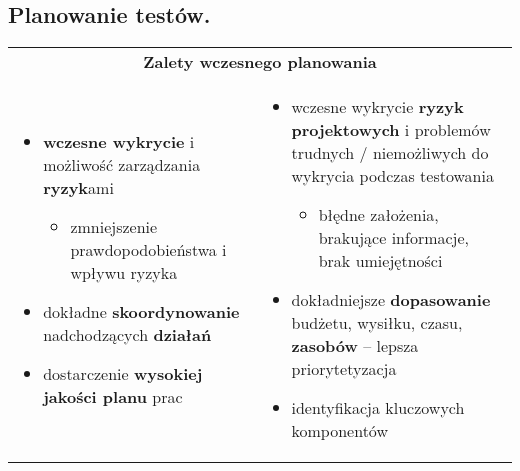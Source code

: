 \documentclass[../main.tex]{subfiles}
\begin{document}
    \subsection{Planowanie testów.}

    \begin{table}[H]
        \begin{center}
            \begin{tabular}{ p{8cm}  p{8cm} }
                \multicolumn{2}{c}{ \textbf{Zalety wczesnego planowania}} \\
                \begin{itemize}
                    \item \textbf{wczesne wykrycie} i możliwość zarządzania \textbf{ryzyk}ami
                    \begin{itemize}
                        \item zmniejszenie prawdopodobieństwa i wpływu ryzyka
                    \end{itemize}
                    \item dokładne \textbf{skoordynowanie} nadchodzących \textbf{działań}
                    \item dostarczenie \textbf{wysokiej jakości planu} prac
                \end{itemize}
                &
                \begin{itemize}
                    \item wczesne wykrycie \textbf{ryzyk projektowych} i problemów trudnych /
                    niemożliwych do wykrycia podczas testowania
                    \begin{itemize}
                        \item błędne założenia, brakujące informacje, brak umiejętności
                    \end{itemize}
                    \item dokładniejsze \textbf{dopasowanie} budżetu, wysiłku, czasu, \textbf{zasobów} – lepsza priorytetyzacja
                    \item identyfikacja kluczowych komponentów
                \end{itemize} \\
            \end{tabular}
        \end{center}
    \end{table}
\end{document}
